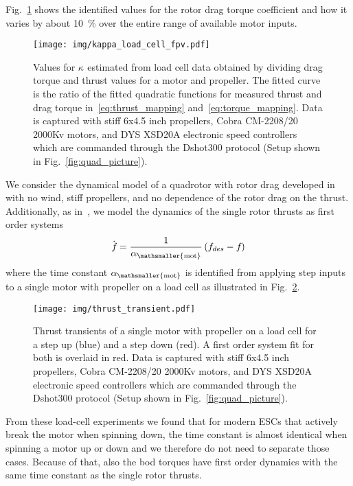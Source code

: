 \documentclass[10pt,a4paper,fleqn]{article}
\newcommand{\rotthrust}[1]{f_{#1}}
\newcommand{\torquecoeff}[1]{\kappa_{#1}}
\newcommand{\motdyn}[0]{\alpha_{\mathsmaller{\mathrm{mot}}}}
\begin{document}
%
Fig.~\ref{fig:kappa_load_cell} shows the identified values for the rotor drag torque coefficient and how it varies by about \SI{10}{\percent} over the entire range of available motor inputs.
%
\begin{figure}[t]
   \centering
   \texttt{[image: img/kappa\_load\_cell\_fpv.pdf]}
   \caption{Values for $\torquecoeff{}$ estimated from load cell data obtained by dividing drag torque and thrust values for a motor and propeller. The fitted curve is the ratio of the fitted quadratic functions for measured thrust and drag torque in~\eqref{eq:thrust_mapping} and~\eqref{eq:torque_mapping}. Data is captured with stiff 6x4.5 inch propellers, Cobra CM-2208/20 2000Kv motors, and DYS XSD20A electronic speed controllers which are commanded through the Dshot300 protocol (Setup shown in Fig.~\ref{fig:quad_picture}).}
   \label{fig:kappa_load_cell}
\end{figure}
%
We consider the dynamical model of a quadrotor with rotor drag developed in~\cite{Kai17ifac} with no wind, stiff propellers, and no dependence of the rotor drag on the thrust.
Additionally, as in~\cite{Faessler17ral}, we model the dynamics of the single rotor thrusts as first order systems
%
\begin{equation}
	\dot{\rotthrust{}} = \frac{1}{\motdyn} \left( \rotthrust{des} - \rotthrust{} \right)
		\label{eq:motor_dynamics}
\end{equation}
%
where the time constant $\motdyn$ is identified from applying step inputs to a single motor with propeller on a load cell as illustrated in Fig.~\ref{fig:thrust_transients}.
%
\begin{figure}[t]
   \centering
   \texttt{[image: img/thrust\_transient.pdf]}
   \caption{Thrust transients of a single motor with propeller on a load cell for a step up (blue) and a step down (red). A first order system fit for both is overlaid in red. Data is captured with stiff 6x4.5 inch propellers, Cobra CM-2208/20 2000Kv motors, and DYS XSD20A electronic speed controllers which are commanded through the Dshot300 protocol (Setup shown in Fig.~\ref{fig:quad_picture}).}
   \label{fig:thrust_transients}
\end{figure}
%
From these load-cell experiments we found that for modern ESCs that actively break the motor when spinning down, the time constant is almost identical when spinning a motor up or down and we therefore do not need to separate those cases.
Because of that, also the bod torques have first order dynamics with the same time constant as the single rotor thrusts.
\end{document}

